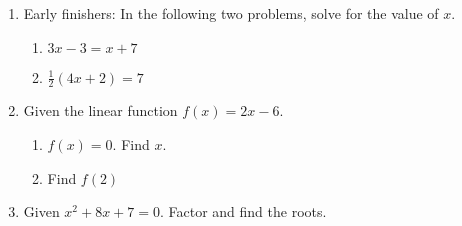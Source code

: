 \documentclass[12pt, twoside]{article}
\begin{document}
\begin{enumerate}
\newpage
\item Early finishers: In the following two problems, solve for the value of $x$.
  \begin{multicols}{2}
    \begin{enumerate}
      \item   $3x-3=x + 7$ \vspace{6cm}
      \item   $\frac{1}{2}(4x+2)=7$ \vspace{6cm}
    \end{enumerate}
  \end{multicols}
  \vspace{5cm}

\item Given the linear function $f(x)=2x-6$.
\begin{multicols}{2}
  \begin{enumerate}
    \item   $f(x)=0$. Find $x$. \vspace{6cm}
    \item Find $f(2)$ \vspace{6cm}
  \end{enumerate}
\end{multicols}
  \vspace{6cm}

\item Given $x^2+8x+7=0$. Factor and find the roots. \vspace{4cm}

\end{enumerate}
\end{document}
